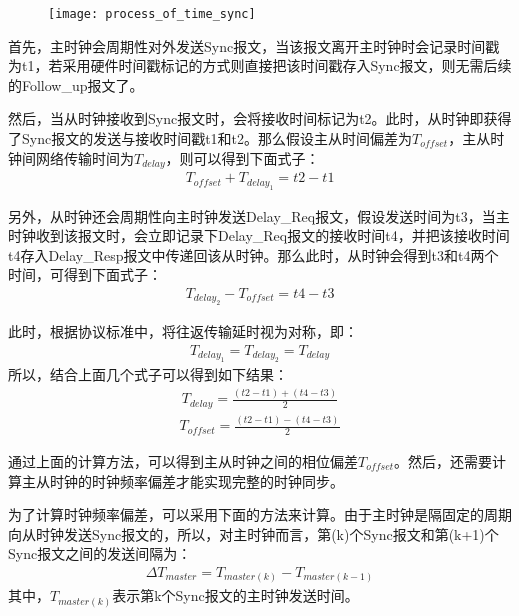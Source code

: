 \begin{figure}[!hbp]
  \centering
  \begin{minipage}[b]{0.6\textwidth}
    \captionstyle{\centering}
    \centering
    \texttt{[image: process\_of\_time\_sync]}
  \end{minipage}     
\end{figure}

首先，主时钟会周期性对外发送Sync报文，当该报文离开主时钟时会记录时间戳为t1，若采用硬件时间戳标记的方式则直接把该时间戳存入Sync报文，则无需后续的Follow\_up报文了。

然后，当从时钟接收到Sync报文时，会将接收时间标记为t2。此时，从时钟即获得了Sync报文的发送与接收时间戳t1和t2。那么假设主从时间偏差为$T_{offset}$，主从时钟间网络传输时间为$T_{delay}$，则可以得到下面式子：
\begin{align}
	T_{offset} + T_{delay_1} = t2 - t1
\end{align}

另外，从时钟还会周期性向主时钟发送Delay\_Req报文，假设发送时间为t3，当主时钟收到该报文时，会立即记录下Delay\_Req报文的接收时间t4，并把该接收时间t4存入Delay\_Resp报文中传递回该从时钟。那么此时，从时钟会得到t3和t4两个时间，可得到下面式子：
\begin{align}
	T_{delay_2} - T_{offset} = t4 - t3
\end{align}

此时，根据协议标准中，将往返传输延时视为对称，即：
\begin{align}
	T_{delay_1} = T_{delay_2} = T_{delay}
\end{align}
所以，结合上面几个式子可以得到如下结果：
\begin{align}
	T_{delay} = \frac{(t2 - t1) + (t4 - t3)}{2}
\end{align}
\begin{align}
	T_{offset} = \frac{(t2 - t1) - (t4 - t3)}{2}
\end{align}

通过上面的计算方法，可以得到主从时钟之间的相位偏差$T_{offset}$。然后，还需要计算主从时钟的时钟频率偏差才能实现完整的时钟同步。

为了计算时钟频率偏差，可以采用下面的方法来计算。由于主时钟是隔固定的周期向从时钟发送Sync报文的，所以，对主时钟而言，第(k)个Sync报文和第(k+1)个Sync报文之间的发送间隔为：
\begin{align}
	\Delta T_{master} = T_{master(k)} - T_{master(k - 1)}
\end{align}
其中，$T_{master(k)}$表示第k个Sync报文的主时钟发送时间。

